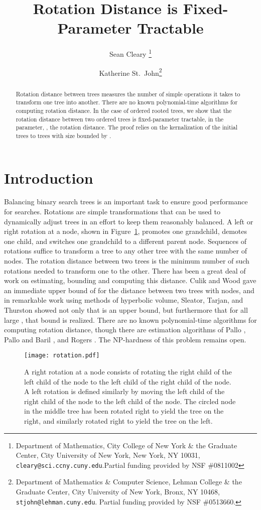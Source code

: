 \documentclass[12pt]{article}
\title{Rotation Distance is Fixed-Parameter Tractable}
\author{Sean Cleary
\thanks{
	Department of Mathematics,
	City College of New York \& the Graduate Center,
	City University of New York,  New York, NY 10031,
	{\tt cleary@sci.ccny.cuny.edu}.Partial funding provided by NSF \#0811002
}
\and 
Katherine St.~John\thanks{
	Department of Mathematics \& Computer Science,
	Lehman College \& the Graduate Center,
        	City University of New York, Bronx, NY 10468,
         {\tt stjohn@lehman.cuny.edu}.  Partial funding provided by NSF  \#0513660.
}
}
\begin{document}
\maketitle

\begin{abstract}
Rotation distance between trees measures the 
number of simple operations it takes to transform one 
tree into another.  There are no known polynomial-time
algorithms for computing rotation distance.
   In the case of ordered rooted  trees,
we show that the rotation distance between two ordered
trees is fixed-parameter tractable, in the parameter, ,
the rotation distance.  The proof relies on the kernalization
of the initial trees to trees with size bounded by .
\end{abstract}

\section{Introduction}

Balancing binary search trees is an important task to ensure good performance for searches.
Rotations are simple transformations that can be used to dynamically adjust trees in an effort to keep
them reasonably balanced.  A left or right rotation at a node, shown in Figure~\ref{rot}, promotes one grandchild, demotes one child, and switches one grandchild to a different parent node.  Sequences of rotations suffice to transform a tree to any other tree with the same number of nodes. The rotation distance between two trees is the minimum number of such rotations needed to transform one to the other.
There has been a great deal of work on estimating, bounding and computing this distance.
Culik and Wood \cite{cw} gave an immediate upper bound of  for the distance between two trees with  nodes, and in remarkable work using methods of hyperbolic volume, Sleator, Tarjan, and Thurston \cite{stt} showed not only that  is an upper bound, but furthermore that for all large , that bound is realized.  There are no known polynomial-time algorithms for computing
rotation distance, though there are estimation algorithms of Pallo \cite{pallo}, Pallo and Baril \cite{barilpallo},
and Rogers \cite{rogers}.  The NP-hardness of this problem remains open.

\begin{figure}
\begin{center}
\texttt{[image: rotation.pdf]}
\end{center}
\caption{\small A right
rotation at a node consists of rotating the right child of the left child of the 
node to the left child of the right child of the node.  A left rotation is defined similarly by
moving the left child of the right child of the node to the left child of the node.
The circled node in the middle tree has been rotated right to yield the
tree on the right, and similarly rotated right to yield the tree on the left.  }
\label{rot}
\end{figure}
\end{document}
